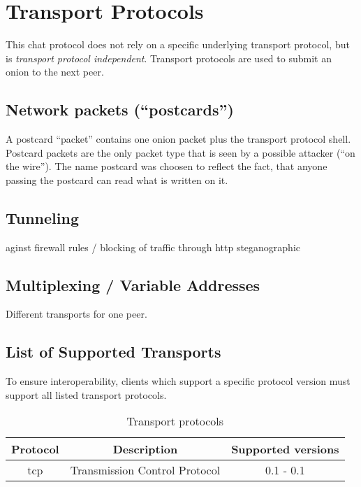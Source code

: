 \section{Transport Protocols}
This chat protocol does not rely on a specific underlying transport protocol,
but is \textit{transport protocol independent}. 
Transport protocols are used to submit an onion to the next peer.

\subsection{Network packets ("`postcards"')}
\label{eofpostcard}
A postcard "`packet"' contains one onion packet plus the transport protocol
shell. Postcard packets are the only packet type that is seen by a possible
attacker ("`on the wire"'). 
The name postcard was choosen to reflect the fact, that anyone
passing the postcard can read what is written on it.
\subsection{Tunneling}
\label{tunneling}
aginst firewall rules / blocking of traffic
through http
steganographic

\subsection{Multiplexing / Variable Addresses}
\label{multiplexing}
Different transports for one peer.

\subsection{List of Supported Transports}
To ensure interoperability, clients which support a specific
protocol version must support all listed transport protocols.
\begin{longtable}{|c|c|c|}
\caption{Transport protocols}\\
\hline
\textbf{Protocol} & \textbf{Description} & \textbf{Supported versions}\\
\hline
tcp & Transmission Control Protocol & 0.1 - 0.1\\
\hline
\end{longtable}


